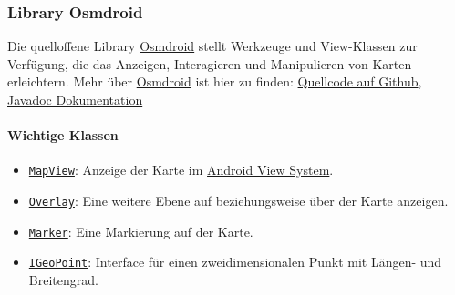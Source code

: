 \subsubsection{Library Osmdroid}\label{App_Map_View_Library}
Die quelloffene Library \href{https://osmdroid.github.io/osmdroid/}{Osmdroid} stellt Werkzeuge und View-Klassen zur Verfügung, die das Anzeigen, 
Interagieren und Manipulieren von Karten erleichtern.
Mehr über \href{https://osmdroid.github.io/osmdroid/}{Osmdroid} ist hier zu finden:
\href{https://github.com/osmdroid/osmdroid}{Quellcode auf Github}, 
\href{https://osmdroid.github.io/osmdroid/javadoc.html}{Javadoc Dokumentation}
\paragraph*{Wichtige Klassen}
\begin{itemize}
    \item \texttt{\href{https://osmdroid.github.io/osmdroid/javadocAll/org/osmdroid/views/MapView.html}
    {MapView}}: Anzeige der Karte im \href{https://developer.android.com/reference/android/view/View}{Android View System}.
    \item \texttt{\href{https://osmdroid.github.io/osmdroid/javadocAll/org/osmdroid/views/overlay/Overlay.html}
    {Overlay}}: Eine weitere Ebene auf beziehungsweise über der Karte anzeigen.
    \item \texttt{\href{https://osmdroid.github.io/osmdroid/javadocAll/org/osmdroid/views/overlay/Marker.html}
    {Marker}}: Eine Markierung auf der Karte.
    \item \texttt{\href{https://osmdroid.github.io/osmdroid/javadocAll/org/osmdroid/api/IGeoPoint.html}
    {IGeoPoint}}: Interface für einen zweidimensionalen Punkt mit Längen- und Breitengrad.
\end{itemize}
